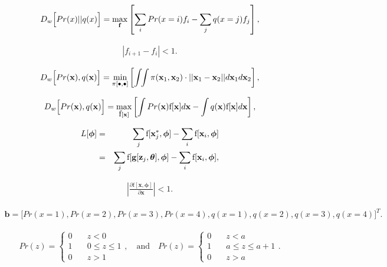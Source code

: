 \documentclass[letterpaper,twoside,openany, titlepage,oldfontcommands,titles,dvipsnames]{memoir}
\begin{document}
\begin{eqnarray}\label{eq:gan_was_dual_discrete}
  D_{w}\Bigl[Pr(x)||q(x)\Bigr] = \max_{\mathbf{f}}\left[\sum_{i} Pr(x=i)f_{i} - \sum_{j}q(x=j)f_{j}\right],
 \end{eqnarray}

\begin{eqnarray}
  |f_{i+1}-f_{i}| < 1.
 \end{eqnarray}

\begin{eqnarray}
 D_{w}\Bigl[Pr(\mathbf{x}),q(\mathbf{x})\Bigr] = \min_{\pi[\bullet,\bullet]}\left[\int\!\!\int \pi(\mathbf{x}_{1},\mathbf{x}_{2})\cdot||\mathbf{x}_{1}-\mathbf{x}_{2}||d\mathbf{x}_{1}d\mathbf{x}_{2}\right],
 \end{eqnarray}

\begin{eqnarray}
 D_{w}\Bigl[Pr(\mathbf{x}),q(\mathbf{x})\Bigr] = \max_{\mbox{f}[\mathbf{x}]}\left[\int Pr(\mathbf{x})\mbox{f}[\mathbf{x}]d\mathbf{x} - \int q(\mathbf{x})\mbox{f}[\mathbf{x}]d\mathbf{x}\right],
 \end{eqnarray}

\begin{eqnarray}
 L[\boldsymbol\phi] &=& \sum_{j} \mbox{f}[\mathbf{x}_{j}^{*},\boldsymbol\phi] -\sum_{i}\mbox{f}[\mathbf{x}_i,\boldsymbol\phi]\nonumber \\
 &=&\sum_{j} \mbox{f}[\mbox{\bf g}[\mathbf{z}_{j},\boldsymbol\theta],\boldsymbol\phi] -\sum_{i}\mbox{f}[\mathbf{x}_i,\boldsymbol\phi],
 \end{eqnarray}

\begin{eqnarray}
  \left| \frac{\partial \mbox{f}[\mathbf{x},\boldsymbol\phi]}{\partial\mathbf{x}}\right| < 1.
 \end{eqnarray}

\begin{eqnarray}
 \mathbf{b} =\bigl[Pr(x\!=\!1),Pr(x\!=\!2),Pr(x\!=\!3),Pr(x\!=\!4),q(x\!=\!1),q(x\!=\!2),q(x\!=\!3),q(x\!=\!4)\bigr]^T.
 \end{eqnarray}



\begin{eqnarray}
 Pr(z) = \begin{cases} 0 & \quad z <0 \\ 1 & \quad 0\leq z\leq 1 \\ 0 & \quad z> 1 \end{cases},\quad \mbox{and} \quad Pr(z) = \begin{cases} 0 & \quad z <a \\ 1 & \quad a\leq z \leq a+1 \\ 0 & \quad z> a \end{cases}.
 \end{eqnarray}
\end{document}
